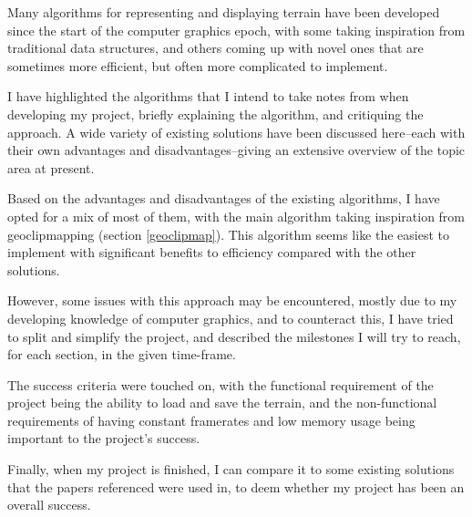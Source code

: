 \documentclass[notitlepage,12pt]{article}
\begin{document}
Many algorithms for representing and displaying terrain have been developed since the start of the computer graphics epoch, with some taking inspiration from traditional data structures, and others coming up with novel ones that are sometimes more efficient, but often more complicated to implement.

I have highlighted the algorithms that I intend to take notes from when developing my project, briefly explaining the algorithm, and critiquing the approach. A wide variety of existing solutions have been discussed here--each with their own advantages and disadvantages--giving an extensive overview of the topic area at present. 

Based on the advantages and disadvantages of the existing algorithms, I have opted for a mix of most of them, with the main algorithm taking inspiration from geoclipmapping (section \ref{geoclipmap}). This algorithm seems like the easiest to implement with significant benefits to efficiency compared with the other solutions.

However, some issues with this approach may be encountered, mostly due to my developing knowledge of computer graphics, and to counteract this, I have tried to split and simplify the project, and described the milestones I will try to reach, for each section, in the given time-frame.

The success criteria were touched on, with the functional requirement of the project being the ability to load and save the terrain, and the non-functional requirements of having constant framerates and low memory usage being important to the project's success.

Finally, when my project is finished, I can compare it to some existing solutions that the papers referenced were used in, to deem whether my project has been an overall success.

\clearpage


\end{document}
